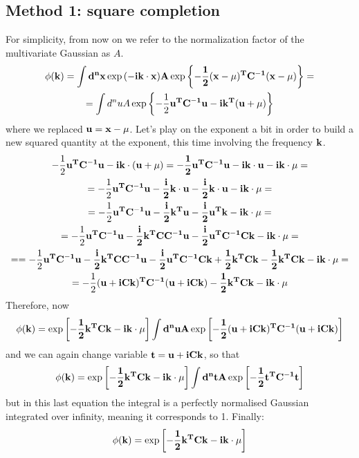 \documentclass[a4paper,11pt,fleqn]{article}
\begin{document}
\subsection{Method 1: square completion}
For simplicity, from now on we refer to the normalization factor of the multivariate Gaussian as $A$.
\begin{gather*}
    \phi(\bf{k}) = \int d^nx \exp{(-i\bf{k}\cdot \bf{x}) A \exp{\left\{-\frac{1}{2}(\bf{x}-\bf{\mu})^T C^{-1} (\bf{x}-\bf{\mu})\right\}}} = \\
    = \int d^n u A \exp{\left\{ -\frac{1}{2}\bf{u}^TC^{-1}\bf{u} - i\bf{k}^T(\bf{u}+\bf{\mu}) \right\}}
\end{gather*}
where we replaced $\bf{u} = \bf{x}-\bf{\mu}$. Let's play on the exponent a bit in order to build a new squared
quantity at the exponent, this time involving the frequency $\bf{k}$.
\begin{multline*}
    -\frac{1}{2}\bf{u}^T C^{-1}\bf{u} - i\bf{k} \cdot (\bf{u}+\bf{\mu}) = -\frac{1}{2}\bf{u}^TC^{-1}\bf{u} - i \bf{k}\cdot \bf{u} -i \bf{k}\cdot \bf{\mu} = \\
    = -\frac{1}{2}\bf{u}^TC^{-1}\bf{u} - \frac{i}{2} \bf{k}\cdot \bf{u} - \frac{i}{2} \bf{k}\cdot \bf{u} -i \bf{k}\cdot \bf{\mu} = \\
    = -\frac{1}{2}\bf{u}^TC^{-1}\bf{u} - \frac{i}{2} \bf{k}^T \bf{u} - \frac{i}{2} \bf{u}^T \bf{k} -i \bf{k}\cdot \bf{\mu} = \\
    = -\frac{1}{2}\bf{u}^TC^{-1}\bf{u} - \frac{i}{2} \bf{k}^T C C^{-1} \bf{u} - \frac{i}{2} \bf{u}^T C^{-1}C \bf{k} -i \bf{k}\cdot \bf{\mu} = \\
    = = -\frac{1}{2}\bf{u}^TC^{-1}\bf{u} - \frac{i}{2} \bf{k}^T C C^{-1} \bf{u} - \frac{i}{2} \bf{u}^T C^{-1}C \bf{k} +\frac{1}{2}\bf{k}^T C \bf{k} -\frac{1}{2}\bf{k}^T C \bf{k} -i \bf{k}\cdot \bf{\mu} = \\
    = -\frac{1}{2}(\bf{u}+iC\bf{k})^T C^{-1} (\bf{u}+iC\bf{k}) -\frac{1}{2}\bf{k}^T C \bf{k} - i \bf{k} \cdot\bf{\mu}  
\end{multline*}
Therefore, now 
\begin{gather*}
    \phi(\bf{k}) = \exp{\left[-\frac{1}{2}\bf{k}^T C \bf{k} - i \bf{k}\cdot \bf{\mu}\right]} \int d^n u A \exp{\left[ -\frac{1}{2}(\bf{u}+iC\bf{k})^T C^{-1} (\bf{u}+iC\bf{k}) \right]}
\end{gather*}
and we can again change variable $\bf{t} = \bf{u}+iC\bf{k}$, so that
\begin{gather*}
    \phi(\bf{k}) = \exp{\left[-\frac{1}{2}\bf{k}^T C \bf{k} - i \bf{k}\cdot \bf{\mu}\right]} \int d^n t A \exp{\left[ -\frac{1}{2}\bf{t}^T C^{-1} \bf{t} \right]}
\end{gather*}
but in this last equation the integral is a perfectly normalised Gaussian integrated over infinity, meaning
it corresponds to 1. Finally:
\begin{gather*}
    \phi(\bf{k}) = \exp{\left[-\frac{1}{2}\bf{k}^T C \bf{k} - i \bf{k} \cdot \bf{\mu}\right]}
\end{gather*}
\end{document}
